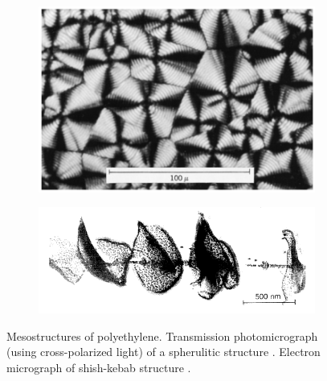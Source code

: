 \begin{figure}[hbtp]
\centering
\begin{subfigure}[c]{0.45\textwidth}
            \centering
            \includegraphics[width=\textwidth]{figures/spherulitic_mesostructure_scp}
            \caption{}
            \label{subfig:spherulitic_mesostructure_scp}
    \end{subfigure} \hfill
    \begin{subfigure}[c]{0.45\textwidth}
            \centering
            \includegraphics[width=\textwidth]{figures/shish_kebab_mesostructure_scp}
            \caption{}
            \label{subfig:shish_kebab_mesostructure_scp}
    \end{subfigure}
	\caption{Mesostructures of polyethylene.  Transmission photomicrograph (using cross-polarized light) of a spherulitic structure \citep{callister2014materials}.  Electron micrograph of shish-kebab structure \citep{peacockHandbookPolyethyleneStructures2014}.}
\label{fig:mesostructure_scp}
\end{figure}

